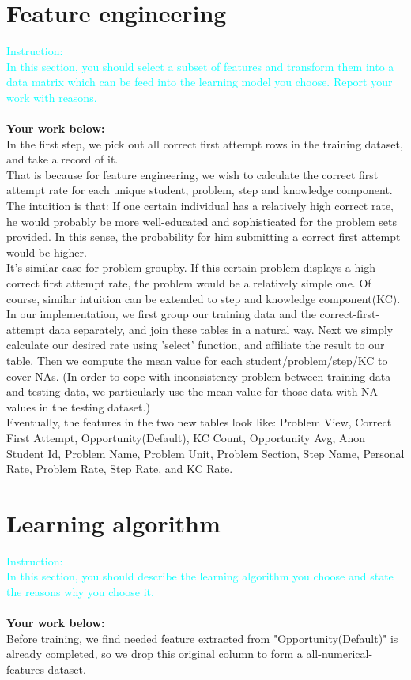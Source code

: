 \documentclass{article}
\begin{document}
\section{Feature engineering}
\textcolor{cyan}{Instruction: \\
In this section, you should select a subset of features and transform them into a data matrix which can be feed into the learning model you choose. Report your work with reasons.}\\\\
\textbf{Your work below:}\\
In the first step, we pick out all correct first attempt rows in the training dataset, and take a record of it.\\
That is because for feature engineering, we wish to calculate the correct first attempt rate for each unique student, problem, step and knowledge component.
The intuition is that: If one certain individual has a relatively high correct rate, he would probably be more well-educated and sophisticated for the problem sets provided.
In this sense, the probability for him submitting a correct first attempt would be higher.\\
It's similar case for problem groupby. If this certain problem displays a high correct first attempt rate, the problem would be a relatively simple one.
Of course, similar intuition can be extended to step and knowledge component(KC).\\
In our implementation, we first group our training data and the correct-first-attempt data separately, and join these tables in a natural way.
Next we simply calculate our desired rate using 'select' function, and affiliate the result to our table.
Then we compute the mean value for each student/problem/step/KC to cover NAs.
(In order to cope with inconsistency problem between training data and testing data, we particularly use the mean value for those data with NA values in the testing dataset.)\\
Eventually, the features in the two new tables look like:
Problem View, Correct First Attempt, Opportunity(Default), KC Count, Opportunity Avg, Anon Student Id, Problem Name, 
Problem Unit, Problem Section, Step Name, Personal Rate, Problem Rate, Step Rate, and KC Rate.


\section{Learning algorithm}
\textcolor{cyan}{Instruction: \\
In this section, you should describe the learning algorithm you choose and state the reasons why you choose it.}\\\\
\textbf{Your work below:}\\
Before training, we find needed feature extracted from "Opportunity(Default)" is already completed, so we drop this original column to form a all-numerical-features dataset.\\
\end{document}
